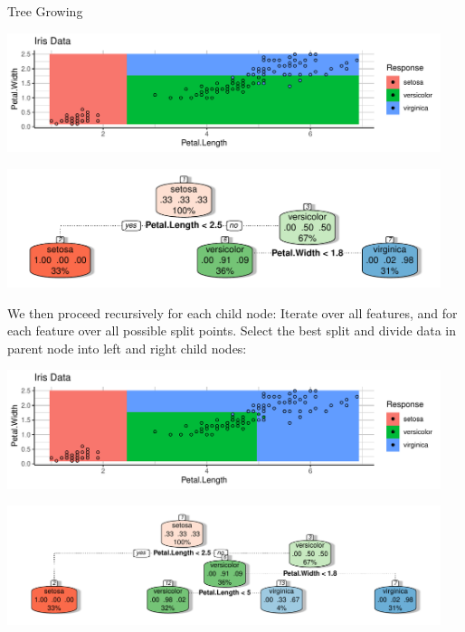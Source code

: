 \documentclass[11pt,compress,t,notes=noshow, xcolor=table]{beamer}
\newenvironment{knitrout}{}{} %
\begin{document}
\begin{vbframe}{Tree Growing}
\begin{knitrout}
{\centering \includegraphics[width=0.95\textwidth]{figure/cart_treegrow_2}

}




{\centering \includegraphics[width=0.95\textwidth]{figure/cart_treegrow_22}

}



\end{knitrout}

\framebreak

We then proceed recursively for each child node:
Iterate over all features, and for each feature over all possible split points. Select the best split and divide data in parent node into left and right child nodes:
\begin{knitrout}\scriptsize
{}\color{fgcolor}

{\centering \includegraphics[width=0.95\textwidth]{figure/cart_treegrow_3}

}




{\centering \includegraphics[width=0.95\textwidth]{figure/cart_treegrow_32}

}



\end{knitrout}

\end{vbframe}
\end{document}
